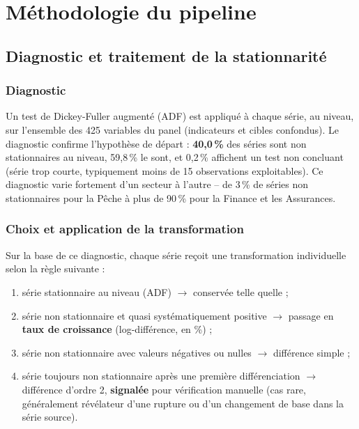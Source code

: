 \documentclass[11pt,a4paper]{report}
\begin{document}
\chapter{Méthodologie du pipeline}

\section{Diagnostic et traitement de la stationnarité}

\subsection{Diagnostic}

Un test de Dickey-Fuller augmenté (ADF) est appliqué à chaque série, au niveau, sur l'ensemble des 425 variables du panel (indicateurs et cibles confondus). Le diagnostic confirme l'hypothèse de départ : \textbf{40,0\,\%} des séries sont non stationnaires au niveau, 59,8\,\% le sont, et 0,2\,\% affichent un test non concluant (série trop courte, typiquement moins de 15 observations exploitables). Ce diagnostic varie fortement d'un secteur à l'autre -- de 3\,\% de séries non stationnaires pour la Pêche à plus de 90\,\% pour la Finance et les Assurances.

\subsection{Choix et application de la transformation}

Sur la base de ce diagnostic, chaque série reçoit une transformation individuelle selon la règle suivante :
\begin{enumerate}[nosep]
  \item série stationnaire au niveau (ADF) $\rightarrow$ conservée telle quelle ;
  \item série non stationnaire et quasi systématiquement positive $\rightarrow$ passage en \textbf{taux de croissance} (log-différence, en \%) ;
  \item série non stationnaire avec valeurs négatives ou nulles $\rightarrow$ différence simple ;
  \item série toujours non stationnaire après une première différenciation $\rightarrow$ différence d'ordre 2, \textbf{signalée} pour vérification manuelle (cas rare, généralement révélateur d'une rupture ou d'un changement de base dans la série source).
\end{enumerate}
\end{document}
